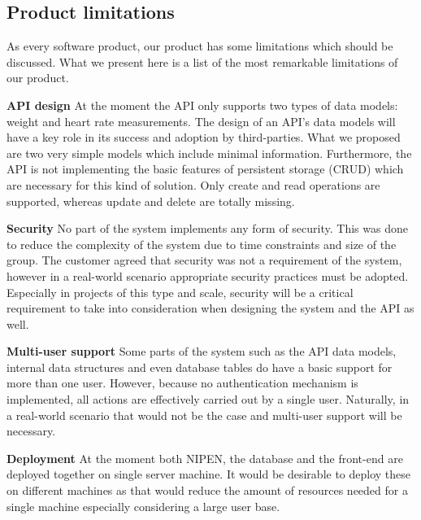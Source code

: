 \subsection{Product limitations}
\label{subsec:limitations}

As every software product, our product has some limitations which should be discussed.
What we present here is a list of the most remarkable limitations of our product.

\textbf{API design}\newline
At the moment the API only supports two types of data models: weight and heart rate measurements.
The design of an API's data models will have a key role in its success and adoption by
third-parties. What we proposed are two very simple models which include minimal information.
Furthermore, the API is not implementing the basic features of persistent storage (CRUD)
which are necessary for this kind of solution. Only create and read operations are supported,
whereas update and delete are totally missing.

\textbf{Security}\newline
No part of the system implements any form of security.
This was done to reduce the complexity of the system due to time constraints and size of the group.
The customer agreed that security was not a requirement of the system, however in a real-world scenario
appropriate security practices must be adopted.
Especially in projects of this type and scale, security will be a critical requirement
to take into consideration when designing the system and the API as well.

\textbf{Multi-user support}\newline
Some parts of the system such as the API data models, internal data structures and even
database tables do have a basic support for more than one user. However, because no authentication
mechanism is implemented, all actions are effectively carried out by a single user.
Naturally, in a real-world scenario that would not be the case and multi-user support will
be necessary.

\textbf{Deployment}\newline
At the moment both NIPEN, the database and the front-end are deployed together on single server machine.
It would be desirable to deploy these on different machines as that would reduce
the amount of resources needed for a single machine especially considering a large user base.



